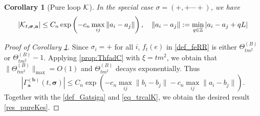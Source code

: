 \documentclass[10pt,reqno]{article}
\theoremstyle{plain} %
\newtheorem{corollary}[theorem]{Corollary}
\theoremstyle{remark}
\numberwithin{equation}{section}
\begin{document}
\begin{corollary}[Pure loop $\cal K$]\label{lem_pureloop} In the special case %
$\sigma=(+,+\cdots +)$, we have 
\begin{align}\label{res_pureKes}\left|{\cal K}_{t, \boldsymbol{\sigma}, \textbf{a}}\right|\le C_n \exp\left(-c_n\max_{ij}\|a_i-a_j\|\right),\quad \|a_i-a_j\|:=\min_{q\in\mathbb Z}|a_i-a_j+qL|
\end{align} 
\end{corollary}
\begin{proof}[Proof of Corollary \ref{lem_pureloop}]
Since  $\sigma_i=+$ for all $i$,   $f_t(e)$ in \eqref{def_feRR} is either  $\Theta^{(B)}_{tm^2}$ or $\Theta^{(B)}_{tm^2}-1$. Applying  \eqref{prop:ThfadC} with $\xi=tm^2$, we obtain that $\|\Theta^{(B)}_{tm^2}\|_{\max}=O(1)$ and $\Theta^{(B)}_{tm^2}$ decays exponentially. Thus 
$$  \left|\Gamma^{(\textbf{b})}_{\textbf{a}}(t, \boldsymbol{\sigma})\right|\le C_n \exp\left(-c_n\max_{ij}\|b_i-b_j\|-c_n \max_{ij}\|a_i-b_j\|\right).
 $$
Together with the \eqref{def_Gatsiga} and \eqref{eq_trcalK}, we obtain the desired result \eqref{res_pureKes}. 
\end{proof}
\end{document}
